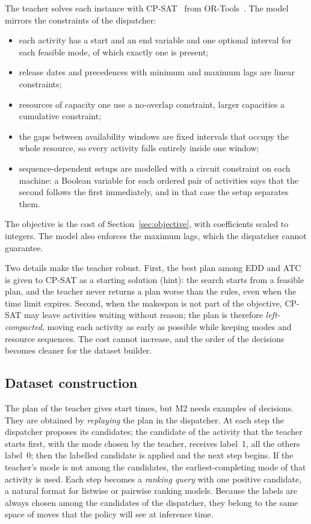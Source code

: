 The teacher solves each instance with CP-SAT~\cite{perron2023cpsat} from
OR-Tools~\cite{ortools}. The model mirrors the constraints of the dispatcher:
\begin{itemize}
  \item each activity has a start and an end variable and one optional interval for each
        feasible mode, of which exactly one is present;
  \item release dates and precedences with minimum and maximum lags are linear constraints;
  \item resources of capacity one use a no-overlap constraint, larger capacities a cumulative
        constraint;
  \item the gaps between availability windows are fixed intervals that occupy the whole
        resource, so every activity falls entirely inside one window;
  \item sequence-dependent setups are modelled with a circuit constraint on each machine: a
        Boolean variable for each ordered pair of activities says that the second follows the
        first immediately, and in that case the setup separates them.
\end{itemize}
The objective is the cost of Section~\ref{sec:objective}, with coefficients scaled to integers.
The model also enforces the maximum lags, which the dispatcher cannot guarantee.

Two details make the teacher robust. First, the best plan among EDD and ATC is given to CP-SAT
as a starting solution (hint): the search starts from a feasible plan, and the teacher never
returns a plan worse than the rules, even when the time limit expires. Second, when the makespan
is not part of the objective, CP-SAT may leave activities waiting without reason; the plan is
therefore \emph{left-compacted}, moving each activity as early as possible while keeping modes
and resource sequences. The cost cannot increase, and the order of the decisions becomes cleaner
for the dataset builder.

\subsection{Dataset construction}
\label{sec:dataset-construction}

The plan of the teacher gives start times, but M2 needs examples of decisions. They are obtained
by \emph{replaying} the plan in the dispatcher. At each step the dispatcher proposes its
candidates; the candidate of the activity that the teacher starts first, with the mode chosen by
the teacher, receives label~1, all the others label~0; then the labelled candidate is applied
and the next step begins. If the teacher's mode is not among the candidates, the
earliest-completing mode of that activity is used. Each step becomes a \emph{ranking query} with
one positive candidate, a natural format for listwise or pairwise ranking models. Because the
labels are always chosen among the candidates of the dispatcher, they belong to the same space
of moves that the policy will see at inference time.

